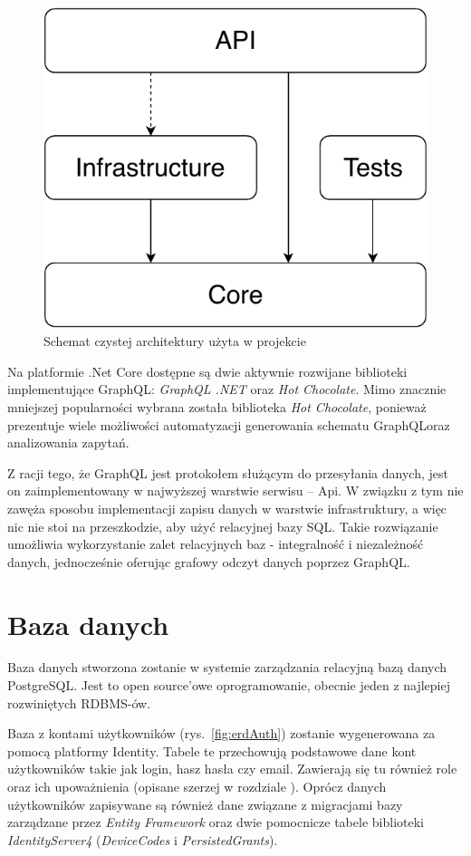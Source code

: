 	\begin{figure}[ht]
		\centering
			\includegraphics[width=0.3\linewidth]{rys03/CleanArch.pdf}
		 \caption{Schemat czystej architektury użyta w projekcie}
		 \label{fig:cleanArch}
	\end{figure}

	Na platformie \@.Net Core dostępne są dwie aktywnie rozwijane biblioteki implementujące GraphQL\@: \emph{GraphQL \@.NET} oraz \emph{Hot Chocolate}.
	Mimo znacznie mniejszej popularności wybrana została biblioteka \emph{Hot Chocolate},
	ponieważ prezentuje wiele możliwości automatyzacji generowania schematu GraphQL\@ oraz analizowania zapytań.

	Z racji tego, że GraphQL jest protokołem służącym do przesyłania danych, jest on zaimplementowany w najwyższej warstwie serwisu -- Api.
	W związku z tym nie zawęża sposobu implementacji zapisu danych w warstwie infrastruktury,
	a więc nic nie stoi na przeszkodzie, aby użyć relacyjnej bazy SQL.
	Takie rozwiązanie umożliwia wykorzystanie zalet relacyjnych baz - integralność i niezależność danych,
	jednocześnie oferując grafowy odczyt danych poprzez GraphQL.

\section{Baza danych}
	Baza danych stworzona zostanie w systemie zarządzania relacyjną bazą danych PostgreSQL.
	Jest to open source'owe oprogramowanie, obecnie jeden z najlepiej rozwiniętych RDBMS-ów.

	Baza z kontami użytkowników (rys.~\ref{fig:erdAuth}) zostanie wygenerowana za pomocą platformy Identity.
	Tabele te przechowują podstawowe dane kont użytkowników takie jak login, hasz hasła czy email.
	Zawierają się tu również role oraz ich upoważnienia (opisane szerzej w rozdziale ).
	Oprócz danych użytkowników zapisywane są również dane związane z migracjami bazy zarządzane przez \emph{Entity Framework}
	oraz dwie pomocnicze tabele biblioteki \emph{IdentityServer4} (\emph{DeviceCodes} i \emph{PersistedGrants}).

